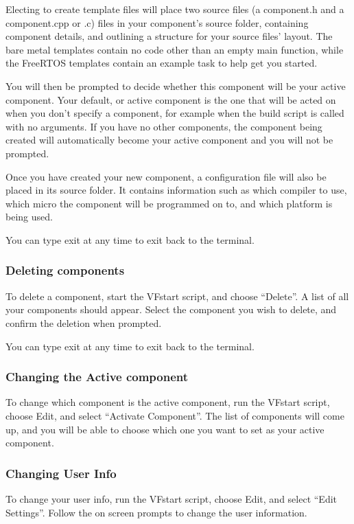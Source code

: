 \documentclass[a4paper, oneside, 11pt, titlepage, onecolumn, openright]{article}
\begin{document}
Electing to create template files will place two source files (a component.h and a component.cpp or .c) files in your component's source folder, containing component details, and outlining a structure for your source files' layout. The bare metal templates contain no code other than an empty main function, while the FreeRTOS templates contain an example task to help get you started.

You will then be prompted to decide whether this component will be your active component. Your default, or active component is the one that will be acted on when you don't specify a component, for example when the build script is called with no arguments. If you have no other components, the component being created will automatically become your active component and you will not be prompted.

Once you have created your new component, a configuration file will also be placed in its source folder. It contains information such as which compiler to use, which micro the component will be programmed on to, and which platform is being used.


You can type exit at any time to exit back to the terminal.


		\subsubsection{Deleting components}
			\label{sss:Deleting components}

To delete a component, start the VFstart script, and choose ``Delete''. A list of all your components should appear. Select the component you wish to delete, and confirm the deletion when prompted.

You can type exit at any time to exit back to the terminal.

		\subsubsection{Changing the Active component}
			\label{sss:EditActiveComponent}

			To change which component is the active component, run the VFstart script, choose Edit, and select ``Activate Component''. The list of components will come up, and you will be able to choose which one you want to set as your active component.

		\subsubsection{Changing User Info}
			\label{sss:ChangeUserInfo} 
			To change your user info, run the VFstart script, choose Edit, and select ``Edit Settings''. Follow the on screen prompts to change the user information.
\end{document}
